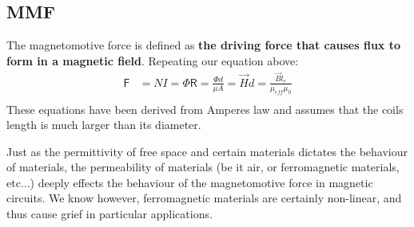 \documentclass{book}
\begin{document}
\subsection{MMF}

The magnetomotive force is defined as \textbf{the driving force that causes flux to form in a magnetic field}. Repeating our equation above:
\begin{align*}
	\mathsf{F} &= NI = \Phi \mathsf{R} = \frac{\Phi d}{\mu A} = \vec{H} d = \frac{\vec{B} l_e}{\mu_{eff} \mu_0}\\
\end{align*}
These equations have been derived from Amperes law and assumes that the coils length is much larger than its diameter. 

Just as the permittivity of free space and certain materials dictates the behaviour of materials, the permeability of materials (be it air, or ferromagnetic materials, etc...) deeply effects the behaviour of the magnetomotive force in magnetic circuits. We know however, ferromagnetic materials are certainly non-linear, and thus cause grief in particular applications. 
\end{document}
